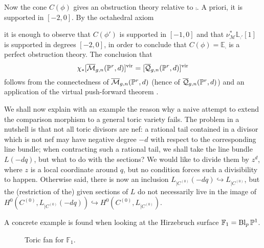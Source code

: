 Now the cone $C(\phi)$ gives an obstruction theory relative to $\comp$. A priori, it is supported in $[-2,0]$. By the octahedral axiom
\begin{center}
\end{center}
it is enough to observe that $C(\phi')$ is supported in $[-1,0]$ \cite[Lemma 4.20]{Manolache-Push} and that $\nu_{\mathcal M}^*\mathbb L_{\comp'}{[1]}$ is supported in degrees $[-2,0]$, in order to conclude that $C(\phi)=\mathbb E_{\comp}$ is a perfect obstruction theory. The conclusion that
\[
 \chi_*[\overline{\mathcal M}_{g,n}(\mathbb P^r,d)]^{\text{vir}}=[\overline{\mathcal Q}_{g,n}(\mathbb P^r,d)]^{\text{vir}}
\]
follows from the connectedness of $\overline{\mathcal M}_{g,n}(\mathbb P^r,d)$ \cite{KP} (hence of $\overline{\mathcal Q}_{g,n}(\mathbb P^r,d)$) and an application of the virtual push-forward theorem \cite[Proposition 4.21]{Manolache-Push}.

We shall now explain with an example the reason why a naive attempt to extend the comparison morphism to a general toric variety fails. The problem in a nutshell is that not all toric divisors are nef: a rational tail contained in a divisor which is not nef may have negative degree $-d$ with respect to the corresponding line bundle; when contracting such a rational tail, we shall take the line bundle $L(-dq)$, but what to do with the sections? We would like to divide them by $z^d$, where $z$ is a local coordinate around $q$, but no condition forces such a divisibility to happen. Otherwise said, there is now an inclusion $L_{|C^{(0)}}(-dq)\hookrightarrow L_{|C^{(0)}}$, but the (restriction of the) given sections of $L$ do not necessarily live in the image of $H^0(C^{(0)},L_{|C^{(0)}}(-dq))\hookrightarrow H^0(C^{(0)},L_{|C^{(0)}})$.

A concrete example is found when looking at the Hirzebruch surface $\mathbb F_1=\operatorname{Bl}_{p}\mathbb P^1$.
\begin{figure}
\caption{Toric fan for $\mathbb F_1$.}
\end{figure}

